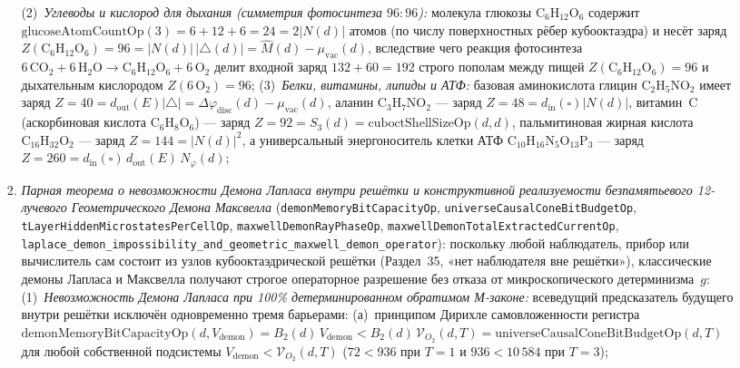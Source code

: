 \begin{theorem}
\begin{enumerate}[label=\textbf{(\roman*)},leftmargin=*]
\begin{itemize}[noitemsep,leftmargin=*]
\begin{enumerate}[label=(\alph*),noitemsep]
      (2)~\emph{Углеводы и кислород для дыхания (симметрия фотосинтеза $96:96$):} молекула глюкозы $\mathrm{C_6H_{12}O_6}$ содержит $\mathrm{glucoseAtomCountOp}(3) = 6+12+6 = 24 = 2|N(d)|$ атомов (по числу поверхностных рёбер кубооктаэдра) и несёт заряд $Z(\mathrm{C_6H_{12}O_6}) = 96 = |N(d)|\,|{\triangle}(d)| = \hat{M}(d) - \mu_{\mathrm{vac}}(d)$, вследствие чего реакция фотосинтеза $6\,\mathrm{CO_2} + 6\,\mathrm{H_2O} \to \mathrm{C_6H_{12}O_6} + 6\,\mathrm{O_2}$ делит входной заряд $132 + 60 = 192$ строго пополам между пищей $Z(\mathrm{C_6H_{12}O_6}) = 96$ и дыхательным кислородом $Z(6\,\mathrm{O_2}) = 96$;
      (3)~\emph{Белки, витамины, липиды и АТФ:} базовая аминокислота глицин $\mathrm{C_2H_5NO_2}$ имеет заряд $Z = 40 = d_{\mathrm{out}}(E)|{\triangle}| = \Delta\varphi_{\mathrm{disc}}(d) - \mu_{\mathrm{vac}}(d)$, аланин $\mathrm{C_3H_7NO_2}$ --- заряд $Z = 48 = d_{\mathrm{in}}(\square)|N(d)|$, витамин~C (аскорбиновая кислота $\mathrm{C_6H_8O_6}$) --- заряд $Z = 92 = S_3(d) = \mathrm{cuboctShellSizeOp}(d,d)$, пальмитиновая жирная кислота $\mathrm{C_{16}H_{32}O_2}$ --- заряд $Z = 144 = |N(d)|^2$, а универсальный энергоноситель клетки АТФ $\mathrm{C_{10}H_{16}N_5O_{13}P_3}$ --- заряд $Z = 260 = d_{\mathrm{in}}(\square)\,d_{\mathrm{out}}(E)\,N_\varphi(d)$;
    \item \emph{Парная теорема о невозможности Демона Лапласа внутри решётки и конструктивной реализуемости безпамятьевого 12-лучевого Геометрического Демона Максвелла} (\texttt{demonMemoryBitCapacityOp}, \texttt{universeCausalConeBitBudgetOp}, \texttt{tLayerHiddenMicrostatesPerCellOp}, \texttt{maxwellDemonRayPhaseOp}, \texttt{maxwellDemonTotalExtractedCurrentOp}, \texttt{laplace\_demon\_impossibility\_and\_geometric\_maxwell\_demon\_operator}):
      поскольку любой наблюдатель, прибор или вычислитель сам состоит из узлов кубооктаэдрической решётки (Раздел~35, «нет наблюдателя вне решётки»), классические демоны Лапласа и Максвелла получают строгое операторное разрешение без отказа от микроскопического детерминизма~$g$:
      (1)~\emph{Невозможность Демона Лапласа при 100\% детерминированном обратимом М-законе:} всеведущий предсказатель будущего внутри решётки исключён одновременно тремя барьерами:
      (а)~принципом Дирихле самовложенности регистра $\mathrm{demonMemoryBitCapacityOp}(d,V_{\mathrm{demon}}) = B_2(d)\,V_{\mathrm{demon}} < B_2(d)\,\mathcal{V}_{O_2}(d,T) = \mathrm{universeCausalConeBitBudgetOp}(d,T)$ для любой собственной подсистемы $V_{\mathrm{demon}} < \mathcal{V}_{O_2}(d,T)$ ($72 < 936$ при $T=1$ и $936 < 10\,584$ при $T=3$);

\end{enumerate}
\end{itemize}
\end{enumerate}
\end{theorem}
